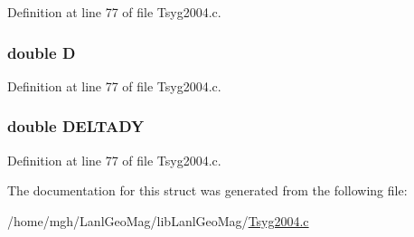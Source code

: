 Definition at line 77 of file Tsyg2004.c.\hypertarget{struct___c_b___t_a_i_l_d8657a5ec76e12f3066fb4b4eb75ace9}{
\subsubsection[{D}]{\setlength{\rightskip}{0pt plus 5cm}double {\bf D}}}
\label{struct___c_b___t_a_i_l_d8657a5ec76e12f3066fb4b4eb75ace9}




Definition at line 77 of file Tsyg2004.c.\hypertarget{struct___c_b___t_a_i_l_cf76b5500556d063c5d6cec9508879f6}{
\subsubsection[{DELTADY}]{\setlength{\rightskip}{0pt plus 5cm}double {\bf DELTADY}}}
\label{struct___c_b___t_a_i_l_cf76b5500556d063c5d6cec9508879f6}




Definition at line 77 of file Tsyg2004.c.

The documentation for this struct was generated from the following file:\begin{CompactItemize}
\item 
/home/mgh/LanlGeoMag/libLanlGeoMag/\hyperlink{_tsyg2004_8c}{Tsyg2004.c}\end{CompactItemize}
